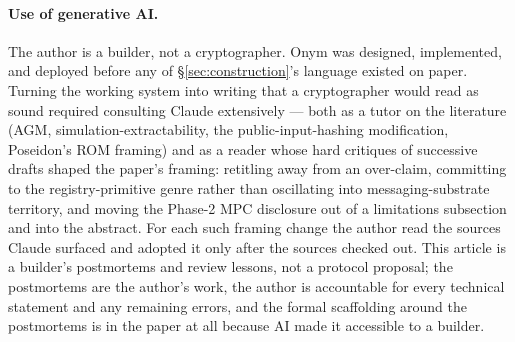 \documentclass[11pt,a4paper]{article}
\begin{document}
\paragraph{Use of generative AI.}
The author is a builder, not a cryptographer. Onym was designed, implemented, and deployed before any of \S\ref{sec:construction}'s language existed on paper. Turning the working system into writing that a cryptographer would read as sound required consulting Claude extensively --- both as a tutor on the literature (AGM, simulation-extractability, the public-input-hashing modification, Poseidon's ROM framing) and as a reader whose hard critiques of successive drafts shaped the paper's framing: retitling away from an over-claim, committing to the registry-primitive genre rather than oscillating into messaging-substrate territory, and moving the Phase-2 MPC disclosure out of a limitations subsection and into the abstract. For each such framing change the author read the sources Claude surfaced and adopted it only after the sources checked out. This article is a builder's postmortems and review lessons, not a protocol proposal; the postmortems are the author's work, the author is accountable for every technical statement and any remaining errors, and the formal scaffolding around the postmortems is in the paper at all because AI made it accessible to a builder.
\end{document}

